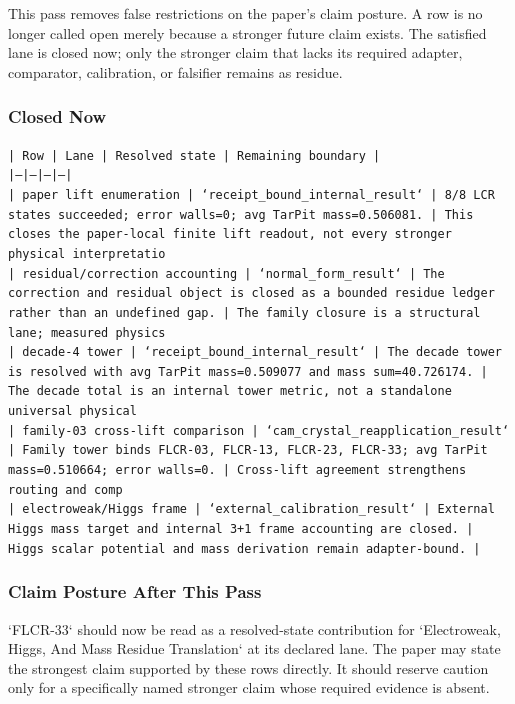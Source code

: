 \documentclass[11pt]{article}
\begin{document}
This pass removes false restrictions on the paper's claim posture. A row is no longer called open merely because a stronger future claim exists. The satisfied lane is closed now; only the stronger claim that lacks its required adapter, comparator, calibration, or falsifier remains as residue.

\subsubsection*{Closed Now}

\noindent\texttt{| Row | Lane | Resolved state | Remaining boundary |}\\
\noindent\texttt{|---|---|---|---|}\\
\noindent\texttt{| paper lift enumeration | `receipt\_bound\_internal\_result` | 8/8 LCR states succeeded; error walls=0; avg TarPit mass=0.506081. | This closes the paper-local finite lift readout, not every stronger physical interpretatio}\\
\noindent\texttt{| residual/correction accounting | `normal\_form\_result` | The correction and residual object is closed as a bounded residue ledger rather than an undefined gap. | The family closure is a structural lane; measured physics}\\
\noindent\texttt{| decade-4 tower | `receipt\_bound\_internal\_result` | The decade tower is resolved with avg TarPit mass=0.509077 and mass sum=40.726174. | The decade total is an internal tower metric, not a standalone universal physical }\\
\noindent\texttt{| family-03 cross-lift comparison | `cam\_crystal\_reapplication\_result` | Family tower binds FLCR-03, FLCR-13, FLCR-23, FLCR-33; avg TarPit mass=0.510664; error walls=0. | Cross-lift agreement strengthens routing and comp}\\
\noindent\texttt{| electroweak/Higgs frame | `external\_calibration\_result` | External Higgs mass target and internal 3+1 frame accounting are closed. | Higgs scalar potential and mass derivation remain adapter-bound. |}\\

\subsubsection*{Claim Posture After This Pass}

`FLCR-33` should now be read as a resolved-state contribution for `Electroweak, Higgs, And Mass Residue Translation` at its declared lane. The paper may state the strongest claim supported by these rows directly. It should reserve caution only for a specifically named stronger claim whose required evidence is absent.
\end{document}
